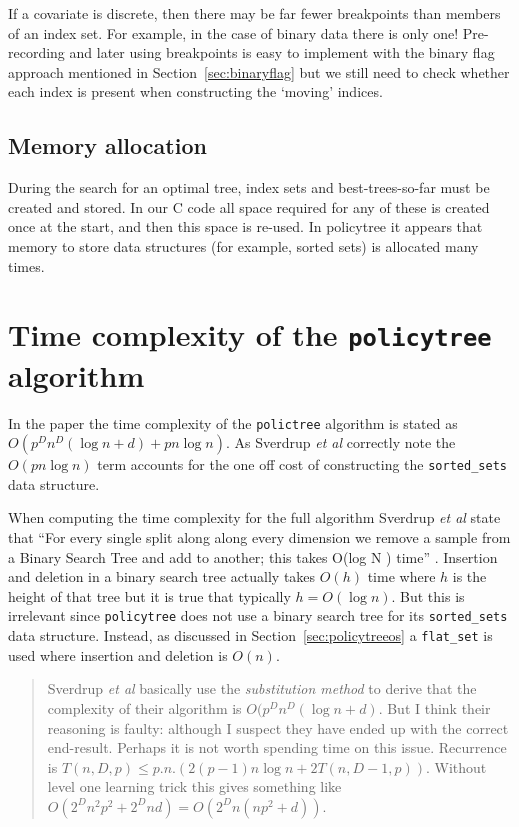 \documentclass{article}
\begin{document}
If a covariate is discrete, then there may be far fewer breakpoints
than members of an index set. For example, in the case of binary data
there is only one! Pre-recording and later using breakpoints is easy
to implement with the binary flag approach mentioned in
Section~\ref{sec:binaryflag} but we still need to check whether each
index is present when constructing the `moving' indices.

\subsection{Memory allocation}
\label{sec:memory}

During the search for an optimal tree, index sets and
best-trees-so-far must be created and stored. In our C code all space
required for any of these is created once at the start, and then this
space is re-used. In policytree it appears that memory to store data
structures (for example, sorted sets) is allocated many times.


\section{Time complexity of the \texttt{policytree} algorithm}
\label{sec:policytreecomplexity}


In the paper \cite{sverdrup2020} the time complexity of the
\texttt{polictree} algorithm is stated as
$O(p^{D}n^{D}(\log n + d) + pn\log n)$. As Sverdrup \emph{et al}
correctly note the $O(pn\log n)$ term accounts for the one off cost of
constructing the \texttt{sorted\_sets} data structure.

When computing the time complexity for the full algorithm Sverdrup
\emph{et al} state that ``For every single split along along every
dimension we remove a sample from a Binary Search Tree and add to
another; this takes O(log N ) time'' \cite{sverdrup2020}. Insertion
and deletion in a binary search tree actually takes $O(h)$ time
\cite{cormen90:_introd_algor} where $h$ is the height of that tree but
it is true that typically $h = O(\log n)$. But this is irrelevant
since \texttt{policytree} does not use a binary search tree for its
\texttt{sorted\_sets} data structure. Instead, as discussed in
Section~\ref{sec:policytreeos} a \texttt{flat\_set} is used where
insertion and deletion is $O(n)$.

\begin{quotation}
  Sverdrup \emph{et al} basically use the \emph{substitution method}
  to derive that the complexity of their algorithm is
  $O(p^{D}n^{D}(\log n + d)$. But I think their reasoning is faulty:
  although I suspect they have ended up with the correct
  end-result. Perhaps it is not worth spending time on this
  issue. Recurrence is $T(n,D,p) \leq p.n.(2(p-1)n\log n +
  2T(n,D-1,p))$. Without level one learning trick this gives something
  like $O(2^{D}n^{2}p^{2} + 2^{D}nd) = O(2^{D}n(np^{2}+d))$. 
\end{quotation}
\end{document}

